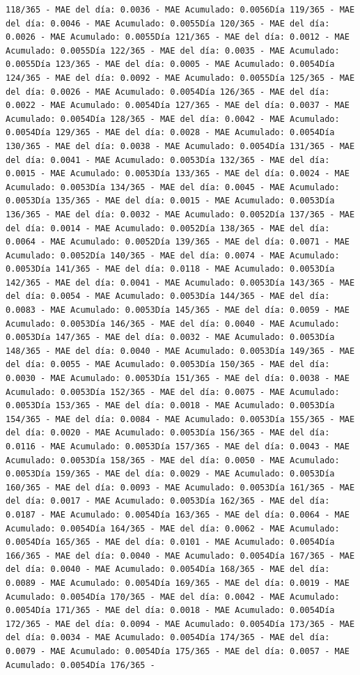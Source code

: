 \documentclass[
]{book}
\begin{document}
\begin{verbatim}
118/365 - MAE del día: 0.0036 - MAE Acumulado: 0.0056Día 119/365 - MAE del día: 0.0046 - MAE Acumulado: 0.0055Día 120/365 - MAE del día: 0.0026 - MAE Acumulado: 0.0055Día 121/365 - MAE del día: 0.0012 - MAE Acumulado: 0.0055Día 122/365 - MAE del día: 0.0035 - MAE Acumulado: 0.0055Día 123/365 - MAE del día: 0.0005 - MAE Acumulado: 0.0054Día 124/365 - MAE del día: 0.0092 - MAE Acumulado: 0.0055Día 125/365 - MAE del día: 0.0026 - MAE Acumulado: 0.0054Día 126/365 - MAE del día: 0.0022 - MAE Acumulado: 0.0054Día 127/365 - MAE del día: 0.0037 - MAE Acumulado: 0.0054Día 128/365 - MAE del día: 0.0042 - MAE Acumulado: 0.0054Día 129/365 - MAE del día: 0.0028 - MAE Acumulado: 0.0054Día 130/365 - MAE del día: 0.0038 - MAE Acumulado: 0.0054Día 131/365 - MAE del día: 0.0041 - MAE Acumulado: 0.0053Día 132/365 - MAE del día: 0.0015 - MAE Acumulado: 0.0053Día 133/365 - MAE del día: 0.0024 - MAE Acumulado: 0.0053Día 134/365 - MAE del día: 0.0045 - MAE Acumulado: 0.0053Día 135/365 - MAE del día: 0.0015 - MAE Acumulado: 0.0053Día 136/365 - MAE del día: 0.0032 - MAE Acumulado: 0.0052Día 137/365 - MAE del día: 0.0014 - MAE Acumulado: 0.0052Día 138/365 - MAE del día: 0.0064 - MAE Acumulado: 0.0052Día 139/365 - MAE del día: 0.0071 - MAE Acumulado: 0.0052Día 140/365 - MAE del día: 0.0074 - MAE Acumulado: 0.0053Día 141/365 - MAE del día: 0.0118 - MAE Acumulado: 0.0053Día 142/365 - MAE del día: 0.0041 - MAE Acumulado: 0.0053Día 143/365 - MAE del día: 0.0054 - MAE Acumulado: 0.0053Día 144/365 - MAE del día: 0.0083 - MAE Acumulado: 0.0053Día 145/365 - MAE del día: 0.0059 - MAE Acumulado: 0.0053Día 146/365 - MAE del día: 0.0040 - MAE Acumulado: 0.0053Día 147/365 - MAE del día: 0.0032 - MAE Acumulado: 0.0053Día 148/365 - MAE del día: 0.0040 - MAE Acumulado: 0.0053Día 149/365 - MAE del día: 0.0055 - MAE Acumulado: 0.0053Día 150/365 - MAE del día: 0.0030 - MAE Acumulado: 0.0053Día 151/365 - MAE del día: 0.0038 - MAE Acumulado: 0.0053Día 152/365 - MAE del día: 0.0075 - MAE Acumulado: 0.0053Día 153/365 - MAE del día: 0.0018 - MAE Acumulado: 0.0053Día 154/365 - MAE del día: 0.0084 - MAE Acumulado: 0.0053Día 155/365 - MAE del día: 0.0020 - MAE Acumulado: 0.0053Día 156/365 - MAE del día: 0.0116 - MAE Acumulado: 0.0053Día 157/365 - MAE del día: 0.0043 - MAE Acumulado: 0.0053Día 158/365 - MAE del día: 0.0050 - MAE Acumulado: 0.0053Día 159/365 - MAE del día: 0.0029 - MAE Acumulado: 0.0053Día 160/365 - MAE del día: 0.0093 - MAE Acumulado: 0.0053Día 161/365 - MAE del día: 0.0017 - MAE Acumulado: 0.0053Día 162/365 - MAE del día: 0.0187 - MAE Acumulado: 0.0054Día 163/365 - MAE del día: 0.0064 - MAE Acumulado: 0.0054Día 164/365 - MAE del día: 0.0062 - MAE Acumulado: 0.0054Día 165/365 - MAE del día: 0.0101 - MAE Acumulado: 0.0054Día 166/365 - MAE del día: 0.0040 - MAE Acumulado: 0.0054Día 167/365 - MAE del día: 0.0040 - MAE Acumulado: 0.0054Día 168/365 - MAE del día: 0.0089 - MAE Acumulado: 0.0054Día 169/365 - MAE del día: 0.0019 - MAE Acumulado: 0.0054Día 170/365 - MAE del día: 0.0042 - MAE Acumulado: 0.0054Día 171/365 - MAE del día: 0.0018 - MAE Acumulado: 0.0054Día 172/365 - MAE del día: 0.0094 - MAE Acumulado: 0.0054Día 173/365 - MAE del día: 0.0034 - MAE Acumulado: 0.0054Día 174/365 - MAE del día: 0.0079 - MAE Acumulado: 0.0054Día 175/365 - MAE del día: 0.0057 - MAE Acumulado: 0.0054Día 176/365 - 
\end{verbatim}
\end{document}
